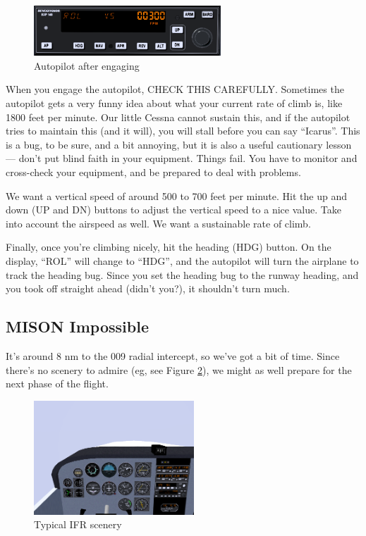 \begin{figure}
  \begin{center}
    \includegraphics[width=7cm]{img/ap_vs}
    \caption{Autopilot after engaging}
    \label{fig:ap_vs}
  \end{center}
\end{figure}


When you engage the autopilot, CHECK THIS CAREFULLY.  Sometimes the
autopilot gets a very funny idea about what your current rate of climb
is, like 1800 feet per minute.  Our little Cessna cannot sustain this,
and if the autopilot tries to maintain this (and it will), you will
stall before you can say ``Icarus''.  This is a bug, to be sure, and a
bit annoying, but it is also a useful cautionary lesson --- don't put
blind faith in your equipment.  Things fail.  You have to monitor and
cross-check your equipment, and be prepared to deal with problems.

We want a vertical speed of around 500 to 700 feet per minute.  Hit
the up and down (UP and DN) buttons to adjust the vertical speed to a
nice value.  Take into account the airspeed as well.  We want a
sustainable rate of climb.

Finally, once you're climbing nicely, hit the heading (HDG)
button.  On the display, ``ROL'' will change to ``HDG'',
and the autopilot will turn the airplane to track the heading bug.
Since you set the heading bug to the runway heading, and you took off
straight ahead (didn't you?), it shouldn't turn much.

\subsection{MISON Impossible}

It's around 8 nm to the 009 radial intercept, so we've got a bit of
time.  Since there's no scenery to admire (eg, see Figure
\ref{fig:murk}), we might as well prepare for the next phase of the
flight.

\begin{figure}
  \begin{center}
    \includegraphics[width=6cm]{img/murk}
    \caption{Typical IFR scenery}
    \label{fig:murk}
  \end{center}
\end{figure}

